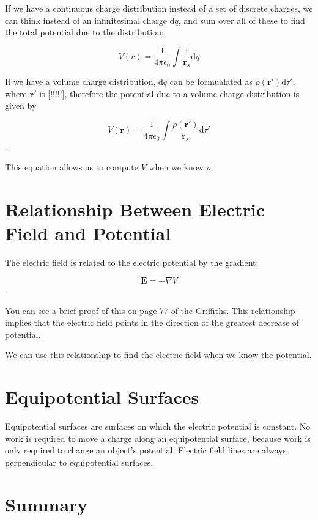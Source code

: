 \documentclass[
  letterpaper,
  DIV=11,
  numbers=noendperiod]{scrreprt}
\begin{document}
If we have a continuous charge distribution instead of a set of discrete
charges, we can think instead of an infinitesimal charge
\(\mathrm{d}q\), and sum over all of these to find the total potential
due to the distribution:

\[ V(r) = \frac{1}{4\pi \epsilon_0} \int \frac{1}{\mathrm{\mathbf{r}}_s} \mathrm{d}q \]

If we have a volume charge distribution, \(\mathrm{d}q\) can be
formualated as \(\rho(\mathrm{\mathbf{r}}') \mathrm{d}\tau'\), where
\(\mathrm{\mathbf{r}}'\) is {[}!!!!!{]}, therefore the potential due to
a volume charge distribution is given by

\[ V(\mathrm{\mathbf{r}}) = \frac{1}{4\pi \epsilon_0} \int \frac{\rho(\mathrm{\mathbf{r}}')}{\mathrm{\mathbf{r}}_s} \mathrm{d} \tau' \].

This equation allows us to compute \(V\) when we know \(\rho\).

\section{Relationship Between Electric Field and
Potential}\label{relationship-between-electric-field-and-potential}

The electric field is related to the electric potential by the gradient:

\[ \mathrm{\mathbf{E}}= -\nabla V \].

You can see a brief proof of this on page 77 of the Griffiths. This
relationship implies that the electric field points in the direction of
the greatest decrease of potential.

We can use this relationship to find the electric field when we know the
potential.

\section{Equipotential Surfaces}\label{equipotential-surfaces}

Equipotential surfaces are surfaces on which the electric potential is
constant. No work is required to move a charge along an equipotential
surface, because work is only required to change an object's potential.
Electric field lines are always perpendicular to equipotential surfaces.

\section{Summary}\label{summary-1}
\end{document}
